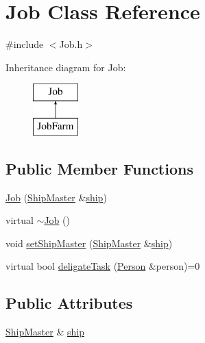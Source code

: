 \hypertarget{classJob}{\section{Job Class Reference}
\label{classJob}
}


{\ttfamily \#include $<$Job.\-h$>$}

Inheritance diagram for Job\-:\begin{figure}[H]
\begin{center}
\leavevmode
\includegraphics[height=2.000000cm]{classJob}
\end{center}
\end{figure}
\subsection*{Public Member Functions}
\begin{DoxyCompactItemize}
\item 
\hyperlink{classJob_a8929b57c85aabbd16ef7d763b155a4d4}{Job} (\hyperlink{classShipMaster}{Ship\-Master} \&\hyperlink{classJob_a728d3562b81cde6fbf5217c2ad002359}{ship})
\item 
virtual \hyperlink{classJob_ab1eef87bf28ea5930582e26faea83269}{$\sim$\-Job} ()
\item 
void \hyperlink{classJob_aa03d408ece696fa802e833b37b315742}{set\-Ship\-Master} (\hyperlink{classShipMaster}{Ship\-Master} \&\hyperlink{classJob_a728d3562b81cde6fbf5217c2ad002359}{ship})
\item 
virtual bool \hyperlink{classJob_a46715fd9c16a0c9855132d7a1925b0c4}{deligate\-Task} (\hyperlink{classPerson}{Person} \&person)=0
\end{DoxyCompactItemize}
\subsection*{Public Attributes}
\begin{DoxyCompactItemize}
\item 
\hyperlink{classShipMaster}{Ship\-Master} \& \hyperlink{classJob_a728d3562b81cde6fbf5217c2ad002359}{ship}
\end{DoxyCompactItemize}


